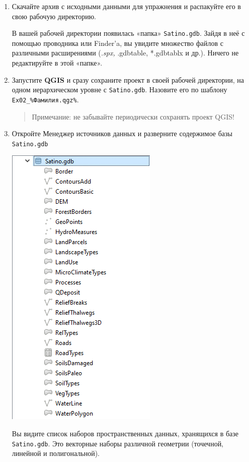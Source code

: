 \documentclass[
  12pt,
]{book}
\begin{document}
\begin{enumerate}
\def\labelenumi{\arabic{enumi}.}
\item
  Скачайте архив с исходными данными для упражнения и распакуйте его в свою рабочую директорию.

  В вашей рабочей директории появилась «папка» \texttt{Satino.gdb}. Зайдя в неё с помощью проводника или Finder'a, вы увидите множество файлов с различными расширениями (\emph{.spx, }.gdbtable, *.gdbtablx и др.). Ничего не редактируйте в этой «папке».
\item
  Запустите \textbf{QGIS} и сразу сохраните проект в своей рабочей директории, на одном иерархическом уровне с \texttt{Satino.gdb}. Назовите его по шаблону \texttt{Ex02\_\%Фамилия.qgz\%}.

  \begin{quote}
  Примечание: не забывайте периодически сохранять проект QGIS!
  \end{quote}
\item
  Откройте Менеджер источников данных и разверните содержимое базы \texttt{Satino.gdb}

  \includegraphics{images/Ex02/ArcGIS_GDB.png}

  Вы видите список наборов пространственных данных, хранящихся в базе \texttt{Satino.gdb}. Это векторные наборы различной геометрии (точечной, линейной и полигональной).


\end{enumerate}
\end{document}
